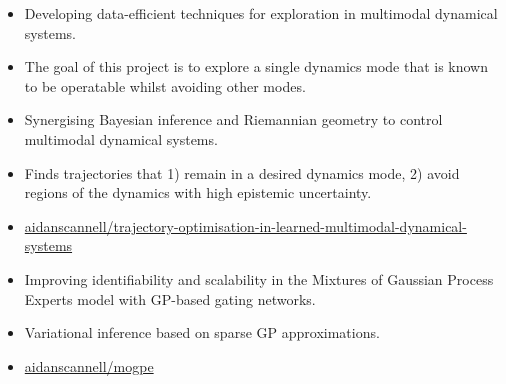 \documentclass[10pt,a4paper,ragged2e,withhyper]{altacv}
\begin{document}
\begin{paracol}{2}
\begin{itemize}
\item Developing data-efficient techniques for exploration in multimodal dynamical systems.
\item The goal of this project is to explore a single dynamics mode that is known to be operatable whilst avoiding other modes.
\end{itemize}


\newpage

\label{sec:orgc68e1bd}

\begin{itemize}
\item Synergising Bayesian inference and Riemannian geometry to control multimodal dynamical systems.
\item Finds trajectories that 1) remain in a desired dynamics mode, 2) avoid regions of the dynamics with high epistemic uncertainty.
\item \href{https://github.com/aidanscannell/trajectory-optimisation-in-learned-multimodal-dynamical-systems}{\faGithub aidanscannell/trajectory-optimisation-in-learned-multimodal-dynamical-systems}
\end{itemize}

\par\divider


\begin{itemize}
\item Improving identifiability and scalability in the Mixtures of Gaussian Process Experts model with GP-based gating networks.
\item Variational inference based on sparse GP approximations.
\item \href{https://github.com/aidanscannell/mogpe}{\faGithub aidanscannell/mogpe}
\end{itemize}


\switchcolumn


\end{paracol}
\end{document}
